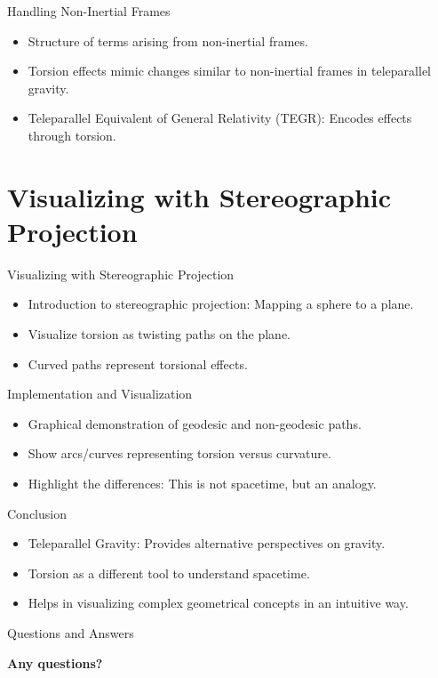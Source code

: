 \documentclass{beamer}
\begin{document}
\begin{frame}{Handling Non-Inertial Frames}
  \begin{itemize}
    \item Structure of terms arising from non-inertial frames.
    \item Torsion effects mimic changes similar to non-inertial frames in teleparallel gravity.
    \item Teleparallel Equivalent of General Relativity (TEGR): Encodes effects through torsion.
  \end{itemize}
\end{frame}

\section{Visualizing with Stereographic Projection}

\begin{frame}{Visualizing with Stereographic Projection}
  \begin{itemize}
    \item Introduction to stereographic projection: Mapping a sphere to a plane.
    \item Visualize torsion as twisting paths on the plane.
    \item Curved paths represent torsional effects.
  \end{itemize}
\end{frame}

\begin{frame}{Implementation and Visualization}
  \begin{itemize}
    \item Graphical demonstration of geodesic and non-geodesic paths.
    \item Show arcs/curves representing torsion versus curvature.
    \item Highlight the differences: This is not spacetime, but an analogy.
  \end{itemize}
\end{frame}

\begin{frame}{Conclusion}
  \begin{itemize}
    \item Teleparallel Gravity: Provides alternative perspectives on gravity.
    \item Torsion as a different tool to understand spacetime.
    \item Helps in visualizing complex geometrical concepts in an intuitive way.
  \end{itemize}
\end{frame}

\begin{frame}{Questions and Answers}
  \begin{center}
    \textbf{Any questions?}
  \end{center}
\end{frame}
\end{document}
